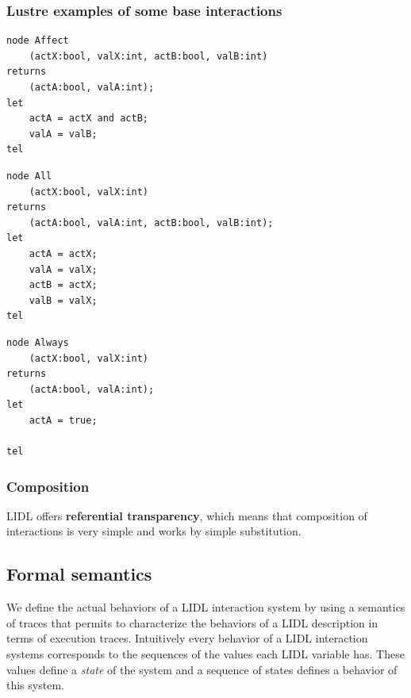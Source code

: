 \subsubsection{Lustre examples of some base interactions}

\begin{lstlisting}
node Affect 
	(actX:bool, valX:int, actB:bool, valB:int)
returns 
	(actA:bool, valA:int);
let
	actA = actX and actB;
	valA = valB;
tel
\end{lstlisting}


\begin{lstlisting}
node All
	(actX:bool, valX:int)
returns 
	(actA:bool, valA:int, actB:bool, valB:int);
let
	actA = actX;
	valA = valX;
	actB = actX;
	valB = valX;
tel
\end{lstlisting}


\begin{lstlisting}
node Always
	(actX:bool, valX:int)
returns 
	(actA:bool, valA:int);
let
	actA = true;
	
tel
\end{lstlisting}


\subsubsection{Composition}

LIDL offers \textbf{referential transparency}, which means that composition of interactions is very simple and works by simple substitution. 


\subsection{Formal semantics}
We define the actual behaviors of a LIDL interaction system by using a
semantics of traces that permits to characterize the behaviors of a
LIDL description in terms of execution traces. Intuitively every
behavior of a LIDL interaction systems corresponds to the sequences of
the values each LIDL variable has. These values define a \textit{state} of the
system and a sequence of states defines a behavior of this system. 

